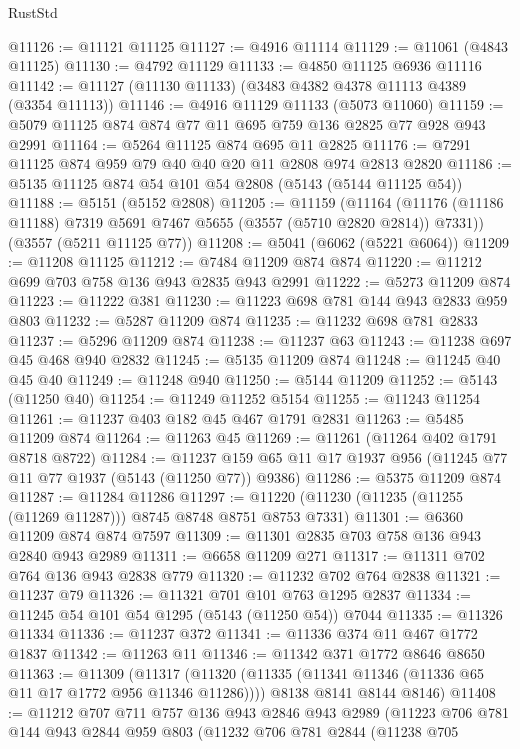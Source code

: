 \begin{lexlean}{RustStd}
\begin{coremodule}
@11126 := @11121 @11125
@11127 := @4916 @11114
@11129 := @11061 (@4843 @11125)
@11130 := @4792 @11129
@11133 := @4850 @11125 @6936 @11116
@11142 := @11127 (@11130 @11133) (@3483 @4382 @4378 @11113 @4389 (@3354 @11113))
@11146 := @4916 @11129 @11133 (@5073 @11060)
@11159 := @5079 @11125 @874 @874 @77 @11 @695 @759 @136 @2825 @77 @928 @943 @2991
@11164 := @5264 @11125 @874 @695 @11 @2825
@11176 := @7291 @11125 @874 @959 @79 @40 @40 @20 @11 @2808 @974 @2813 @2820
@11186 := @5135 @11125 @874 @54 @101 @54 @2808 (@5143 (@5144 @11125 @54))
@11188 := @5151 (@5152 @2808)
@11205 := @11159
    (@11164 (@11176 (@11186 @11188) @7319 @5691 @7467 @5655 (@3557 (@5710 @2820 @2814)) @7331))
    (@3557 (@5211 @11125 @77))
@11208 := @5041 (@6062 (@5221 @6064))
@11209 := @11208 @11125
@11212 := @7484 @11209 @874 @874
@11220 := @11212 @699 @703 @758 @136 @943 @2835 @943 @2991
@11222 := @5273 @11209 @874
@11223 := @11222 @381
@11230 := @11223 @698 @781 @144 @943 @2833 @959 @803
@11232 := @5287 @11209 @874
@11235 := @11232 @698 @781 @2833
@11237 := @5296 @11209 @874
@11238 := @11237 @63
@11243 := @11238 @697 @45 @468 @940 @2832
@11245 := @5135 @11209 @874
@11248 := @11245 @40 @45 @40
@11249 := @11248 @940
@11250 := @5144 @11209
@11252 := @5143 (@11250 @40)
@11254 := @11249 @11252 @5154
@11255 := @11243 @11254
@11261 := @11237 @403 @182 @45 @467 @1791 @2831
@11263 := @5485 @11209 @874
@11264 := @11263 @45
@11269 := @11261 (@11264 @402 @1791 @8718 @8722)
@11284 := @11237 @159 @65 @11 @17 @1937 @956 (@11245 @77 @11 @77 @1937 (@5143 (@11250 @77)) @9386)
@11286 := @5375 @11209 @874
@11287 := @11284 @11286
@11297 := @11220 (@11230 (@11235 (@11255 (@11269 @11287))) @8745 @8748 @8751 @8753 @7331)
@11301 := @6360 @11209 @874 @874 @7597
@11309 := @11301 @2835 @703 @758 @136 @943 @2840 @943 @2989
@11311 := @6658 @11209 @271
@11317 := @11311 @702 @764 @136 @943 @2838 @779
@11320 := @11232 @702 @764 @2838
@11321 := @11237 @79
@11326 := @11321 @701 @101 @763 @1295 @2837
@11334 := @11245 @54 @101 @54 @1295 (@5143 (@11250 @54)) @7044
@11335 := @11326 @11334
@11336 := @11237 @372
@11341 := @11336 @374 @11 @467 @1772 @1837
@11342 := @11263 @11
@11346 := @11342 @371 @1772 @8646 @8650
@11363 := @11309
    (@11317
      (@11320 (@11335 (@11341 @11346 (@11336 @65 @11 @17 @1772 @956 @11346 @11286))))
      @8138
      @8141
      @8144
      @8146)
@11408 := @11212
    @707
    @711
    @757
    @136
    @943
    @2846
    @943
    @2989
    (@11223
      @706
      @781
      @144
      @943
      @2844
      @959
      @803
      (@11232
        @706
        @781
        @2844
        (@11238
          @705

\end{coremodule}
\end{lexlean}
